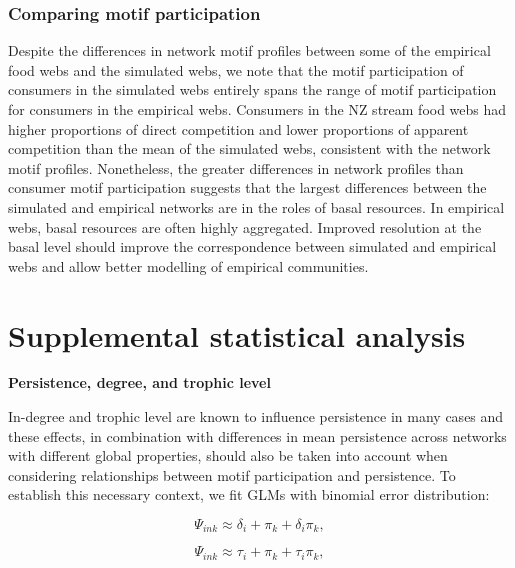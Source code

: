 \documentclass[12pt]{article}
\begin{document}
\begin{spacing}{2.0}
    
    \subsubsection*{Comparing motif participation}
      
      Despite the differences in network motif profiles between some of the empirical food webs and the simulated webs, we note that the motif participation of consumers in the simulated webs entirely spans the range of motif participation for consumers in the empirical webs.
      Consumers in the NZ stream food webs had higher proportions of direct competition and lower proportions of apparent competition than the mean of the simulated webs, consistent with the network motif profiles.
      Nonetheless, the greater differences in network profiles than consumer motif participation suggests that the largest differences between the simulated and empirical networks are in the roles of basal resources.
      In empirical webs, basal resources are often highly aggregated. 
      Improved resolution at the basal level should improve the correspondence between simulated and empirical webs and allow better modelling of empirical communities.
    

\clearpage        

        
\section{Supplemental statistical analysis}

    \textbf{Persistence, degree, and trophic level}
    
            In-degree and trophic level are known to influence persistence in many cases and these effects, in combination with differences in mean persistence across networks with different global properties, should also be taken into account when considering relationships between motif participation and persistence.
            To establish this necessary context, we fit GLMs with binomial error distribution:

            \begin{spacing}{1.0}
            \begin{multicols}{2}
            \begin{equation}
                    \Psi_{ink} \approx \delta_{i} + \pi_{k} + \delta_{i}\pi_{k},
                    \label{degeq}
                \end{equation}
        
            \begin{equation}
                    \Psi_{ink} \approx \tau_{i} + \pi_{k} + \tau_{i}\pi_{k},
                    \label{TLeq}
                \end{equation}
            \end{multicols}
            \end{spacing}
        

\end{spacing}
\end{document}
